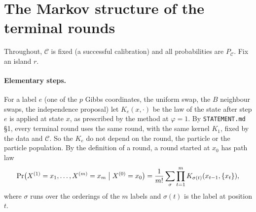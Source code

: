 \documentclass[11pt]{article}
\theoremstyle{remark}
\newcommand{\C}{\mathcal C}
\newcommand{\Pc}{P_{\C}}
\begin{document}
\section{The Markov structure of the terminal rounds}

Throughout, $\C$ is fixed (a successful calibration) and all probabilities are $\Pc$. Fix an island $r$.

\paragraph{Elementary steps.} For a label $e$ (one of the $p$ Gibbs coordinates, the uniform swap, the $B$ neighbour swaps, the independence proposal) let $K_e(x,\cdot)$ be the law of the state after step $e$ is applied at state $x$, as prescribed by the method at $\varphi=1$. By \texttt{STATEMENT.md} \S1, every terminal round uses the same round, with the same kernel $K_1$, fixed by the data and $\C$. So the $K_e$ do not depend on the round, the particle or the particle population. By the definition of a round, a round started at $x_0$ has path law
\begin{equation}\label{eq:pathlaw}
\Pr\bigl(X^{(1)}=x_1,\dots,X^{(m)}=x_m\bigm|X^{(0)}=x_0\bigr)=\frac1{m!}\sum_{\sigma}\prod_{t=1}^m K_{\sigma(t)}(x_{t-1},\{x_t\}),
\end{equation}
where $\sigma$ runs over the orderings of the $m$ labels and $\sigma(t)$ is the label at position $t$.
\end{document}
